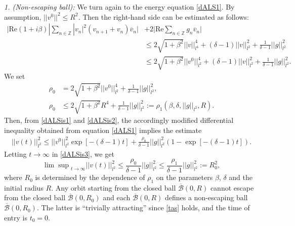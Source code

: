 \documentclass[preprintnumbers,amsmath,amssymb]{revtex4}
\begin{document}

\textit {1. (Non-escaping ball):} We turn again to the energy equation \eqref{dALS1}. By assumption, $||v^0||^2\leq R^2$. Then the right-hand side can be estimated as follows:
\begin{equation}
\label{dALSis1}
\begin{split}
\bigg| \mathrm{Re}(1+i\beta)|\sum_{n\in\mathbb{Z}}|v_n|^2(v_{n+1}+v_n)\overline{v}_n\bigg|&+2\bigg|\mathrm{Re}\sum_{n\in\mathbb{Z}}g_n\overline{v}_n\bigg|\\
&\leq 2\sqrt{1+\beta^2}||v||^4_{l^4}+(\delta-1)||v||^2_{l^2}+\frac{1}{\delta-1}|| g||_{l^2}^2\\
&\leq 2\sqrt{1+\beta^2}||v^0||^4_{l^2}+(\delta-1)||v||^2_{l^2}+\frac{1}{\delta-1}||g||_{l^2}^2.
\end{split}
\end{equation}
We set
\begin{equation}
\label{dALSis2}
\begin{split}
\rho_0&= 2\sqrt{1+\beta^2}||v^0||^4_{l^2}+\frac{1}{\delta-1}||g||_{l^2}^2,\\
\rho_0&\leq  2\sqrt{1+\beta^2}R^4+\frac{1}{\delta-1}||g||_{l^2}^2:=\rho_1(\beta, \delta,||g||_{l^2},R).
\end{split}
\end{equation}
Then, from \eqref{dALSis1} and \eqref{dALSis2}, the accordingly modified differential inequality obtained from equation \eqref{dALS1} implies the estimate
\begin{eqnarray}
\label{dALSis3}
|| v(t)||_{l^2}^2\le || v^0||_{l^2}^2\exp[-(\delta-1) t]+\frac{\rho_0}{\delta-1}|| g||_{l^2}^2\left(1-\exp[-(\delta-1) t]\right).
\end{eqnarray}
Letting $t\rightarrow \infty$ in \eqref{dALSis3}, we get
\begin{equation}
{\lim\sup}_{t \rightarrow \infty} || v(t)||_{l^2}^2\le \frac{\rho_0}{\delta-1}|| g||_{l^2}^2\leq \frac{\rho_1}{\delta-1}|| g||_{l^2}^2:=R_0^2,
\end{equation}
where $R_0$ is determined by the dependence of $\rho_1$ on the parameters $\beta$, $\delta$ and the initial radius $R$. Any orbit starting from the closed ball  $\overline{\mathcal{B}}(0,R)$ cannot escape from the closed ball $\overline{\mathcal{B}}(0,R_0)$ and each $\overline{\mathcal{B}}(0,R)$ defines a non-escaping ball $\overline{\mathcal{B}}(0,R_0)$. The latter is ``trivially attracting'' since \eqref{tas} holds, and the time of entry is $t_0=0$.\\
\end{document}
